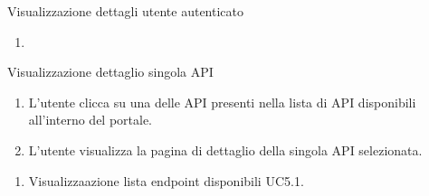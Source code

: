 \begin{usecase}{4.3}{Visualizzazione dettagli utente autenticato}\label{uc:visualizzazione-dettagli-utente-autenticato}
    \usecasepre{}
    \usecasedesc{}
    \usecasepost{}

    \usecasemain{}
        \begin{enumerate}
            \item 
        \end{enumerate}

\end{usecase}

\begin{usecase}{5}{Visualizzazione dettaglio singola API}\label{uc:visualizzazione-dettaglio-singola-api}

    \usecasemain{}
        \begin{enumerate}
            \item L'utente clicca su una delle API presenti nella lista di API disponibili all'interno del portale.
            \item L'utente visualizza la pagina di dettaglio della singola API selezionata.
        \end{enumerate}

    \usecasegen{}
        \begin{enumerate}
            \item Visualizzaazione lista endpoint disponibili UC5.1.
        \end{enumerate}


\end{usecase}


